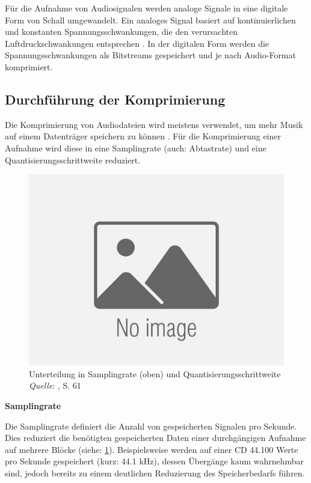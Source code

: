 Für die Aufnahme von Audiosignalen werden analoge Signale in eine digitale Form von Schall umgewandelt. Ein analoges Signal basiert auf kontinuierlichen und konstanten Spannungsschwankungen, die den verursachten Luftdruckschwankungen entsprechen \parencite{digital_representation}. In der digitalen Form werden die Spannungsschwankungen als Bitstreams gespeichert und je nach Audio-Format komprimiert.

%
\subsection{Durchführung der Komprimierung}
\label{compression}
%

Die Komprimierung von Audiodateien wird meistens verwendet, um mehr Musik auf einem Datenträger speichern zu können \parencite{what_is_audio_compression}. Für die Komprimierung einer Aufnahme wird diese in eine Samplingrate (auch: Abtastrate) und eine Quantisierungsschrittweite reduziert.

%
\begin{figure}[h]
    \includegraphics[width=1\textwidth]{images/Samplingrate_Quantisierungsgröße.PNG}
    \caption{Unterteilung in Samplingrate (oben) und Quantisierungsschrittweite\\\hspace{\textwidth}\textit{Quelle}: \cite{fundamentals_of_music_processing}, S. 61}
    \label{fig:samplingrate}
\end{figure}
%

%
\textbf{Samplingrate}
%

Die Samplingrate definiert die Anzahl von gespeicherten Signalen pro Sekunde. Dies reduziert die benötigten gespeicherten Daten einer durchgängigen Aufnahme auf mehrere Blöcke (siehe: \cref{fig:samplingrate}). Beispielsweise werden auf einer CD 44.100 Werte pro Sekunde gespeichert (kurz: 44.1 kHz), dessen Übergänge kaum wahrnehmbar sind, jedoch bereits zu einem deutlichen Reduzierung des Speicherbedarfs führen.


